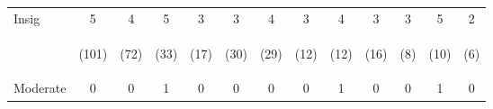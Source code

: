\begin{tabular}{lcccccccccccc}
\hline \noalign{\smallskip}Insig & 5 & 4 & 5 & 3 & 3 & 4 & 3 & 4 & 3 & 3 & 5 & 2\\
 & \begin{footnotesize}(101)\end{footnotesize} & \begin{footnotesize}(72)\end{footnotesize} & \begin{footnotesize}(33)\end{footnotesize} & \begin{footnotesize}(17)\end{footnotesize} & \begin{footnotesize}(30)\end{footnotesize} & \begin{footnotesize}(29)\end{footnotesize} & \begin{footnotesize}(12)\end{footnotesize} & \begin{footnotesize}(12)\end{footnotesize} & \begin{footnotesize}(16)\end{footnotesize} & \begin{footnotesize}(8)\end{footnotesize} & \begin{footnotesize}(10)\end{footnotesize} & \begin{footnotesize}(6)\end{footnotesize}\\
\noalign{\smallskip}Moderate & 0 & 0 & 1 & 0 & 0 & 0 & 0 & 1 & 0 & 0 & 1 & 0\\

\end{tabular}
